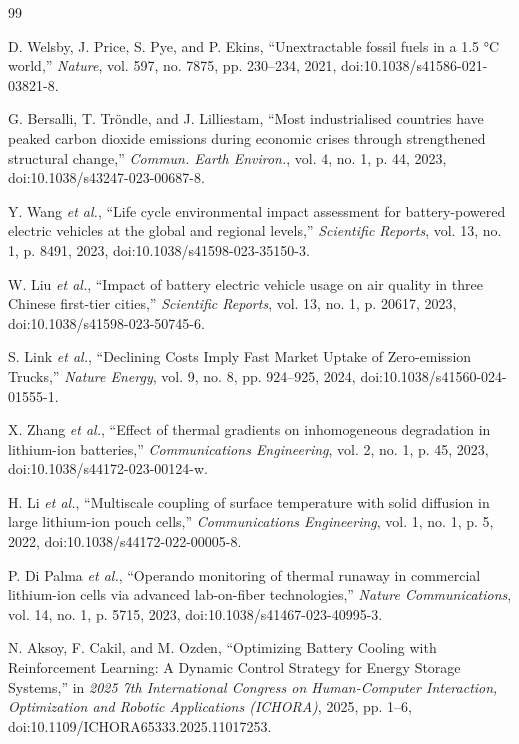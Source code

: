 \documentclass{article}
\begin{document}
\begin{thebibliography}{99}

D. Welsby, J. Price, S. Pye, and P. Ekins, ``Unextractable fossil fuels in a 1.5 °C world,'' \textit{Nature}, vol. 597, no. 7875, pp. 230--234, 2021, doi:10.1038/s41586-021-03821-8.

G. Bersalli, T. Tr{\"o}ndle, and J. Lilliestam, ``Most industrialised countries have peaked carbon dioxide emissions during economic crises through strengthened structural change,'' \textit{Commun. Earth Environ.}, vol. 4, no. 1, p. 44, 2023, doi:10.1038/s43247-023-00687-8.

Y. Wang \textit{et al.}, ``Life cycle environmental impact assessment for battery-powered electric vehicles at the global and regional levels,'' \textit{Scientific Reports}, vol. 13, no. 1, p. 8491, 2023, doi:10.1038/s41598-023-35150-3.

W. Liu \textit{et al.}, ``Impact of battery electric vehicle usage on air quality in three Chinese first-tier cities,'' \textit{Scientific Reports}, vol. 13, no. 1, p. 20617, 2023, doi:10.1038/s41598-023-50745-6.

S. Link \textit{et al.}, ``Declining Costs Imply Fast Market Uptake of Zero-emission Trucks,'' \textit{Nature Energy}, vol. 9, no. 8, pp. 924--925, 2024, doi:10.1038/s41560-024-01555-1.

X. Zhang \textit{et al.}, ``Effect of thermal gradients on inhomogeneous degradation in lithium-ion batteries,'' \textit{Communications Engineering}, vol. 2, no. 1, p. 45, 2023, doi:10.1038/s44172-023-00124-w.

H. Li \textit{et al.}, ``Multiscale coupling of surface temperature with solid diffusion in large lithium-ion pouch cells,'' \textit{Communications Engineering}, vol. 1, no. 1, p. 5, 2022, doi:10.1038/s44172-022-00005-8.

P. Di Palma \textit{et al.}, ``Operando monitoring of thermal runaway in commercial lithium-ion cells via advanced lab-on-fiber technologies,'' \textit{Nature Communications}, vol. 14, no. 1, p. 5715, 2023, doi:10.1038/s41467-023-40995-3.

N. Aksoy, F. Cakil, and M. Ozden, ``Optimizing Battery Cooling with Reinforcement Learning: A Dynamic Control Strategy for Energy Storage Systems,'' in \textit{2025 7th International Congress on Human-Computer Interaction, Optimization and Robotic Applications (ICHORA)}, 2025, pp. 1--6, doi:10.1109/ICHORA65333.2025.11017253.


\end{thebibliography}
\end{document}
